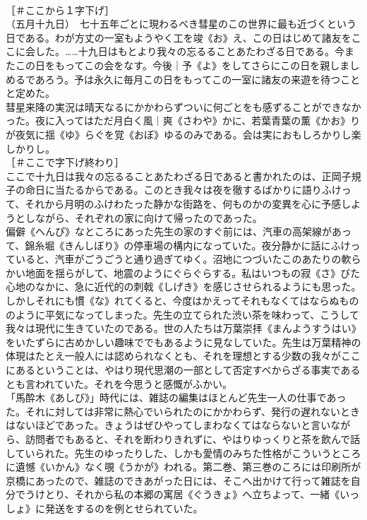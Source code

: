 \documentclass[8pt]{extreport}
\begin{document}
\begin{CJK}{UTF8}{min}
\\	［＃ここから１字下げ］
\\	（五月十九日）　七十五年ごとに現わるべき彗星のこの世界に最も近づくという日である。わが方丈の一室もようやく工を竣《お》え、この日はじめて諸友をここに会した。……十九日はもとより我々の忘るることあたわざる日である。今またこの日をもってこの会をなす。今後｜予《よ》をしてさらにこの日を親しましめるであろう。予は永久に毎月この日をもってこの一室に諸友の来遊を待つことと定めた。
\\	彗星来降の実況は晴天なるにかかわらずついに何ごとをも感ずることができなかった。夜に入ってはただ月白く風｜爽《さわや》かに、若葉青葉の薫《かお》りが夜気に揺《ゆ》らぐを覚《おぼ》ゆるのみである。会は実におもしろかりし楽しかりし。
\\	［＃ここで字下げ終わり］
\\	ここで十九日は我々の忘るることあたわざる日であると書かれたのは、正岡子規子の命日に当たるからである。このとき我々は夜を徹するばかりに語りふけって、それから月明のふけわたった静かな街路を、何ものかの変異を心に予感しようとしながら、それぞれの家に向けて帰ったのであった。
\\	偏僻《へんぴ》なところにあった先生の家のすぐ前には、汽車の高架線があって、錦糸堀《きんしぼり》の停車場の構内になっていた。夜分静かに話にふけっていると、汽車がごうごうと通り過ぎてゆく。沼地につづいたこのあたりの軟らかい地面を揺らがして、地震のようにぐらぐらする。私はいつもの寂《さ》びた心地のなかに、急に近代的の刺戟《しげき》を感じさせられるようにも思った。しかしそれにも慣《な》れてくると、今度はかえってそれもなくてはならぬもののように平気になってしまった。先生の立てられた渋い茶を味わって、こうして我々は現代に生きていたのである。世の人たちは万葉崇拝《まんようすうはい》をいたずらに古めかしい趣味ででもあるように見なしていた。先生は万葉精神の体現はたとえ一般人には認められなくとも、それを理想とする少数の我々がここにあるということは、やはり現代思潮の一部として否定すべからざる事実であるとも言われていた。それを今思うと感慨がふかい。
\\	「馬酔木《あしび》」時代には、雑誌の編集はほとんど先生一人の仕事であった。それに対しては非常に熱心でいられたのにかかわらず、発行の遅れないときはないほどであった。きょうはぜひやってしまわなくてはならないと言いながら、訪問者でもあると、それを断わりきれずに、やはりゆっくりと茶を飲んで話していられた。先生のゆったりした、しかも愛情のみちた性格がこういうところに遺憾《いかん》なく覗《うかが》われる。第二巻、第三巻のころには印刷所が京橋にあったので、雑誌のできあがった日には、そこへ出かけて行って雑誌を自分でうけとり、それから私の本郷の寓居《ぐうきょ》へ立ちよって、一緒《いっしょ》に発送をするのを例とせられていた。

\end{CJK}
\end{document}

